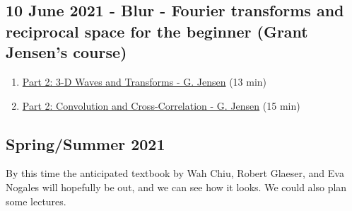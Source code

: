\documentclass[11pt, oneside]{article}   	%
\begin{document}
\subsection{10 June 2021 - Blur - Fourier transforms and reciprocal space for the beginner (Grant Jensen's course)}
\begin{enumerate}
	\item \href{https://youtu.be/INtehLmqfmA}{Part 2: 3-D Waves and Transforms - G. Jensen} (13 min)
	\item \href{https://youtu.be/MQm6ZP1F6ms}{Part 2: Convolution and Cross-Correlation - G. Jensen} (15 min)
	\end{enumerate}


\pagebreak
\subsection{Spring/Summer 2021}
By this time the anticipated textbook by Wah Chiu, Robert Glaeser, and Eva Nogales will hopefully be out, and we can see how it looks. We could also plan some lectures.

\end{document}
